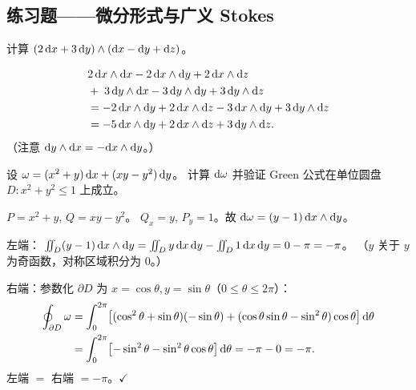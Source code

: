 \documentclass{article}
\begin{document}
\subsection{练习题——微分形式与广义 Stokes}

\begin{exercise}[楔积基本计算]
  计算 $(2\,\mathrm{d} x + 3\,\mathrm{d} y) \wedge (\mathrm{d} x - \mathrm{d} y + \mathrm{d} z)$。
\end{exercise}

\begin{solution}
  \begin{align*}
    &2\,\mathrm{d} x \wedge \mathrm{d} x - 2\,\mathrm{d} x \wedge \mathrm{d} y + 2\,\mathrm{d} x
    \wedge \mathrm{d} z \\
    &+\; 3\,\mathrm{d} y \wedge \mathrm{d} x - 3\,\mathrm{d} y \wedge \mathrm{d} y + 3\,\mathrm{d}
    y \wedge \mathrm{d} z \\
    &= -2\,\mathrm{d} x\wedge\mathrm{d} y + 2\,\mathrm{d} x\wedge\mathrm{d} z
    - 3\,\mathrm{d} x\wedge\mathrm{d} y + 3\,\mathrm{d} y\wedge\mathrm{d} z \\
    &= -5\,\mathrm{d} x\wedge\mathrm{d} y + 2\,\mathrm{d} x\wedge\mathrm{d} z + 3\,\mathrm{d} y\wedge\mathrm{d} z.
  \end{align*}
  （注意 $\mathrm{d} y\wedge\mathrm{d} x = -\mathrm{d} x\wedge\mathrm{d} y$。）
\end{solution}

\begin{exercise}
  设 $\omega = (x^2+y)\,\mathrm{d} x + (xy - y^2)\,\mathrm{d} y$。
  计算 $\mathrm{d}\omega$ 并验证 Green 公式在单位圆盘 $D: x^2+y^2\le 1$ 上成立。
\end{exercise}

\begin{solution}
  $P = x^2+y$, $Q = xy-y^2$。
  $Q_x = y$, $P_y = 1$。故 $\mathrm{d}\omega = (y-1)\,\mathrm{d} x\wedge\mathrm{d} y$。

  左端：
  $\iint_D (y-1)\,\mathrm{d} x\wedge\mathrm{d} y
  = \iint_D y\,\mathrm{d} x\,\mathrm{d} y - \iint_D 1\,\mathrm{d} x\,\mathrm{d} y
  = 0 - \pi = -\pi$。
  （$y$ 关于 $y$ 为奇函数，对称区域积分为 $0$。）

  右端：参数化 $\partial D$ 为 $x=\cos\theta, y=\sin\theta$（$0\le\theta\le 2\pi$）：
  \begin{align*}
    \oint_{\partial D} \omega
    &= \int_0^{2\pi}\bigl[(\cos^2\theta+\sin\theta)(-\sin\theta)
    + (\cos\theta\sin\theta-\sin^2\theta)\cos\theta\bigr]\,\mathrm{d}\theta \\
    &= \int_0^{2\pi}\bigl[-\sin^2\theta -
    \sin^2\theta\cos\theta\bigr]\,\mathrm{d}\theta
    = -\pi - 0 = -\pi.
  \end{align*}
  左端 $=$ 右端 $= -\pi$。$\checkmark$
\end{solution}
\end{document}
